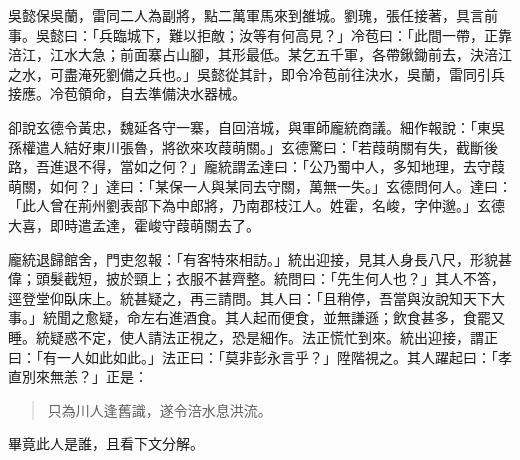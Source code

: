 吳懿保吳蘭，雷同二人為副將，點二萬軍馬來到雒城。劉瑰，張任接著，具言前事。吳懿曰：「兵臨城下，難以拒敵；汝等有何高見？」冷苞曰：「此間一帶，正靠涪江，江水大急；前面寨占山腳，其形最低。某乞五千軍，各帶鍬鋤前去，決涪江之水，可盡淹死劉備之兵也。」吳懿從其計，即令冷苞前往決水，吳蘭，雷同引兵接應。冷苞領命，自去準備決水器械。

卻說玄德令黃忠，魏延各守一寨，自回涪城，與軍師龐統商議。細作報說：「東吳孫權遣人結好東川張魯，將欲來攻葭萌關。」玄德驚曰：「若葭萌關有失，截斷後路，吾進退不得，當如之何？」龐統謂孟達曰：「公乃蜀中人，多知地理，去守葭萌關，如何？」達曰：「某保一人與某同去守關，萬無一失。」玄德問何人。達曰：「此人曾在荊州劉表部下為中郎將，乃南郡枝江人。姓霍，名峻，字仲邈。」玄德大喜，即時遣孟達，霍峻守葭萌關去了。

龐統退歸館舍，門吏忽報：「有客特來相訪。」統出迎接，見其人身長八尺，形貌甚偉；頭髮截短，披於頸上；衣服不甚齊整。統問曰：「先生何人也？」其人不答，逕登堂仰臥床上。統甚疑之，再三請問。其人曰：「且稍停，吾當與汝說知天下大事。」統聞之愈疑，命左右進酒食。其人起而便食，並無謙遜；飲食甚多，食罷又睡。統疑惑不定，使人請法正視之，恐是細作。法正慌忙到來。統出迎接，謂正曰：「有一人如此如此。」法正曰：「莫非彭永言乎？」陞階視之。其人躍起曰：「孝直別來無恙？」正是：

\begin{quote}
只為川人逢舊識，遂令涪水息洪流。
\end{quote}

畢竟此人是誰，且看下文分解。
